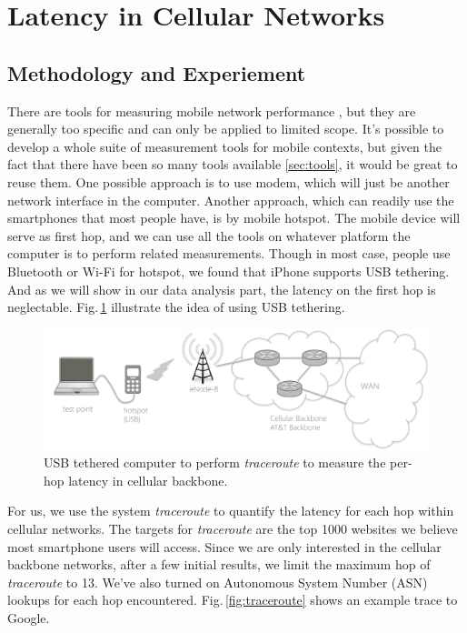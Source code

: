 \section{Latency in Cellular Networks}

\subsection{Methodology and Experiement}
\label{sec:methodology}

There are tools for measuring mobile network performance \cite{speedtest, huang2011mobiperf}, but they are generally too specific and can only be applied to limited scope. It's possible to develop a whole suite of measurement tools for mobile contexts, but given the fact that there have been so many tools available \ref{sec:tools}, it would be great to reuse them. One possible approach is to use modem, which will just be another network interface in the computer. Another approach, which can readily use the smartphones that most people have, is by mobile hotspot. The mobile device will serve as first hop, and we can use all the tools on whatever platform the computer is to perform related measurements. Though in most case, people use Bluetooth or Wi-Fi for hotspot, we found that iPhone supports USB tethering. And as we will show in our data analysis part, the latency on the first hop is neglectable. Fig.\,\ref{fig:mobile_networks_method} illustrate the idea of using USB tethering.

\begin{figure}
  \centering
  \includegraphics[width=\linewidth]{../figs/mobile_networks_method.pdf}
  \caption{USB tethered computer to perform {\it traceroute} to measure the per-hop latency in cellular backbone.}
  \label{fig:mobile_networks_method}
\end{figure}

For us, we use the system {\it traceroute} to quantify the latency for each hop within cellular networks. The targets for {\it traceroute} are the top 1000 websites we believe most smartphone users will access. Since we are only interested in the cellular backbone networks, after a few initial results, we limit the maximum hop of {\it traceroute} to 13. We've also turned on Autonomous System Number (ASN) lookups for each hop encountered. Fig.\,\ref{fig:traceroute} shows an example trace to Google.

